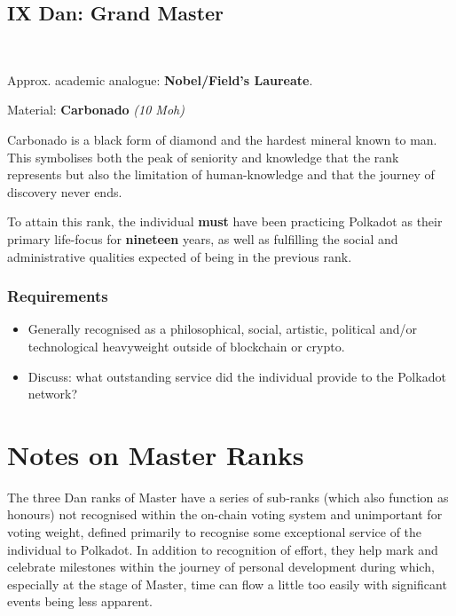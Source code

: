 \documentclass[9pt,oneside]{amsart}
\begin{document}
\subsection{IX Dan: Grand Master}\label{ix-dan-grand-master}~\\


Approx. academic analogue: \textbf{Nobel/Field's Laureate}.

Material: \textbf{Carbonado} \emph{(10 Moh)}

Carbonado is a black form of diamond and the hardest mineral known to man. This symbolises both the peak of seniority and knowledge that the rank represents but also the limitation of human-knowledge and that the journey of discovery never ends.

To attain this rank, the individual \textbf{must} have been practicing Polkadot as their primary life-focus for \textbf{nineteen} years, as well as fulfilling the social and administrative qualities expected of being in the previous rank.

\subsubsection{Requirements}\label{requirements-9}

\begin{itemize}
\item Generally recognised as a philosophical, social, artistic, political and/or technological heavyweight outside of blockchain or crypto.
\item Discuss: what outstanding service did the individual provide to the Polkadot network?
\end{itemize}

\section{Notes on Master Ranks}\label{notes-on-master-ranks}

The three Dan ranks of Master have a series of sub-ranks (which also function as honours) not recognised within the on-chain voting system and unimportant for voting weight, defined primarily to recognise some exceptional service of the individual to Polkadot. In addition to recognition of effort, they help mark and celebrate milestones within the journey of personal development during which, especially at the stage of Master, time can flow a little too easily with significant events being less apparent.
\end{document}
